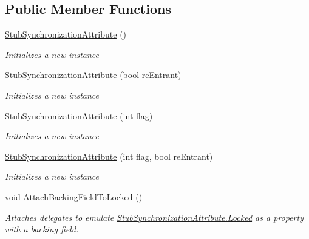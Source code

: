 \subsection*{Public Member Functions}
\begin{DoxyCompactItemize}
\item 
\hyperlink{class_system_1_1_runtime_1_1_remoting_1_1_contexts_1_1_fakes_1_1_stub_synchronization_attribute_a5e0a6d43129690f9ff94b3b721a900a4}{Stub\-Synchronization\-Attribute} ()
\begin{DoxyCompactList}\small\item\em Initializes a new instance\end{DoxyCompactList}\item 
\hyperlink{class_system_1_1_runtime_1_1_remoting_1_1_contexts_1_1_fakes_1_1_stub_synchronization_attribute_aab048ac3b679795bcfeac72fd3cd3086}{Stub\-Synchronization\-Attribute} (bool re\-Entrant)
\begin{DoxyCompactList}\small\item\em Initializes a new instance\end{DoxyCompactList}\item 
\hyperlink{class_system_1_1_runtime_1_1_remoting_1_1_contexts_1_1_fakes_1_1_stub_synchronization_attribute_ae0afb4d05af7f5f78547038e8b1d52c4}{Stub\-Synchronization\-Attribute} (int flag)
\begin{DoxyCompactList}\small\item\em Initializes a new instance\end{DoxyCompactList}\item 
\hyperlink{class_system_1_1_runtime_1_1_remoting_1_1_contexts_1_1_fakes_1_1_stub_synchronization_attribute_a5de122ff1666fd312880cbe584f4075d}{Stub\-Synchronization\-Attribute} (int flag, bool re\-Entrant)
\begin{DoxyCompactList}\small\item\em Initializes a new instance\end{DoxyCompactList}\item 
void \hyperlink{class_system_1_1_runtime_1_1_remoting_1_1_contexts_1_1_fakes_1_1_stub_synchronization_attribute_aee931621117e017357581e855c88b08b}{Attach\-Backing\-Field\-To\-Locked} ()
\begin{DoxyCompactList}\small\item\em Attaches delegates to emulate \hyperlink{class_system_1_1_runtime_1_1_remoting_1_1_contexts_1_1_fakes_1_1_stub_synchronization_attribute_a97e81e3519c0b8be9c3a05593964c913}{Stub\-Synchronization\-Attribute.\-Locked} as a property with a backing field.\end{DoxyCompactList}\item 

\end{DoxyCompactItemize}
